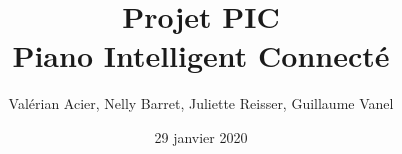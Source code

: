 \documentclass[11pt]{beamer}
\author[Acier, Barret, Reisser, Vanel]{Valérian Acier, Nelly Barret, Juliette Reisser, Guillaume Vanel}
\title[PIC]{Projet PIC \\ Piano Intelligent Connecté}
\date{29 janvier 2020}
\begin{document}
\begin{frame}
\titlepage
\end{frame}





\end{document}
